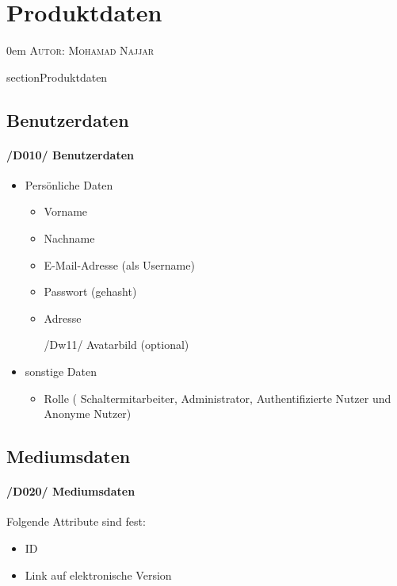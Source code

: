 \documentclass{article}
\makeatletter
\newcommand{\sectionauthor}[1]{
	{\parindent 0em \large \scshape Autor: #1 \par \nobreak \vspace*{2em}}
	\@afterheading
}
\makeatother
\begin{document}
\section{Produktdaten} %
\sectionauthor{Mohamad Najjar}

section{Produktdaten}
\subsection{Benutzerdaten}
	\label{D010} \paragraph{/D010/ Benutzerdaten}
\begin{itemize}
    	\item Persönliche Daten
		\begin{itemize}
			\item Vorname
			\item Nachname
			\item E-Mail-Adresse (als Username)
			\item Passwort (gehasht)
			\item Adresse
            \item [/Dw11/] Avatarbild (optional)

		\end{itemize}


		\item sonstige Daten
		\begin{itemize}
		    \item Rolle ( Schaltermitarbeiter, Administrator, Authentifizierte Nutzer und Anonyme Nutzer)
		\end{itemize}
	\end{itemize}
	\subsection{Mediumsdaten}
	\label{D020} \paragraph{/D020/ Mediumsdaten}
	Folgende Attribute sind fest:

	\begin{itemize}
	    \item ID
	    \item Link auf elektronische Version
	   	\end{itemize}
\end{document}
